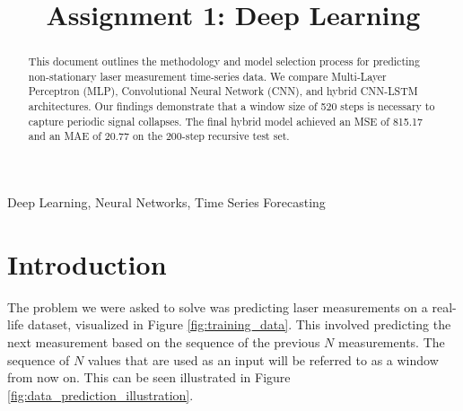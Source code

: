 \documentclass[conference]{IEEEtran}
\begin{document}
\title{Assignment 1: Deep Learning}

\author{
\and
{}
\and
{}
\and
{}
}

\maketitle

\begin{abstract}
This document outlines the methodology and model selection process for predicting non-stationary laser measurement time-series data. We compare Multi-Layer Perceptron (MLP), Convolutional Neural Network (CNN), and hybrid CNN-LSTM architectures. Our findings demonstrate that a window size of 520 steps is necessary to capture periodic signal collapses. The final hybrid model achieved an MSE of 815.17 and an MAE of 20.77 on the 200-step recursive test set.
\end{abstract}

\begin{IEEEkeywords}
Deep Learning, Neural Networks, Time Series Forecasting
\end{IEEEkeywords}

\section{Introduction}
The problem we were asked to solve was predicting laser measurements on a real-life dataset, visualized in Figure \ref{fig:training_data}. This involved predicting the next measurement based on the sequence of the previous $N$ measurements. The sequence of $N$ values that are used as an input will be referred to as a window from now on. This can be seen illustrated in Figure \ref{fig:data_prediction_illustration}.
\end{document}
